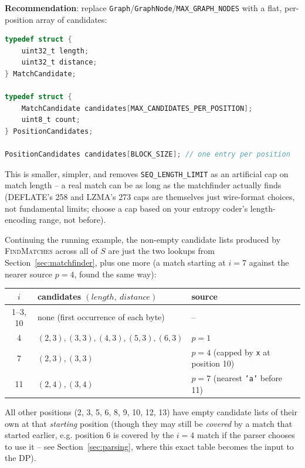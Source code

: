 \documentclass[11pt]{article}
\begin{document}
\textbf{Recommendation}: replace \texttt{Graph}/\texttt{GraphNode}/\texttt{MAX\_GRAPH\_NODES}
with a flat, per-position array of candidates:
\begin{lstlisting}[language=C]
typedef struct {
    uint32_t length;
    uint32_t distance;
} MatchCandidate;

typedef struct {
    MatchCandidate candidates[MAX_CANDIDATES_PER_POSITION];
    uint8_t count;
} PositionCandidates;

PositionCandidates candidates[BLOCK_SIZE]; // one entry per position
\end{lstlisting}
This is smaller, simpler, and removes \texttt{SEQ\_LENGTH\_LIMIT} as an artificial cap on
match length -- a real match can be as long as the matchfinder actually finds (DEFLATE's
258 and LZMA's 273 caps are themselves just wire-format choices, not fundamental
limits; choose a cap based on your entropy coder's length-encoding range, not before).

\begin{tcolorbox}[colback=green!5!white,colframe=green!45!black,title=Worked example: the candidate lists for $S$]
Continuing the running example, the non-empty candidate lists produced by
\textsc{FindMatches} across all of $S$ are just the two lookups from
Section~\ref{sec:matchfinder}, plus one more (a match starting at $i=7$ against the
nearer source $p=4$, found the same way):
\begin{center}
\begin{tabular}{@{}clll@{}}
\toprule
$i$ & candidates $(length,\ distance)$ & source \\
\midrule
1--3, 10 & none (first occurrence of each byte) & -- \\
4 & $(2,3),(3,3),(4,3),(5,3),(6,3)$ & $p=1$ \\
7 & $(2,3),(3,3)$ & $p=4$ (capped by \texttt{x} at position 10) \\
11 & $(2,4),(3,4)$ & $p=7$ (nearest \texttt{'a'} before 11) \\
\bottomrule
\end{tabular}
\end{center}
All other positions (2, 3, 5, 6, 8, 9, 10, 12, 13) have empty candidate lists of their
own at that \emph{starting} position (though they may still be \emph{covered} by a
match that started earlier, e.g. position 6 is covered by the $i{=}4$ match if the
parser chooses to use it -- see Section~\ref{sec:parsing}, where this exact table
becomes the input to the DP).
\end{tcolorbox}
\end{document}
